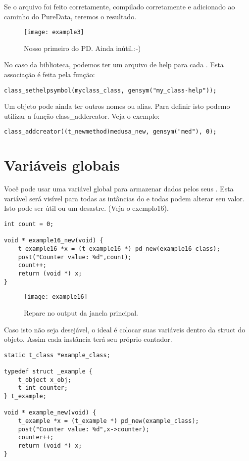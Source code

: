 Se o arquivo foi feito corretamente, compilado corretamente e adicionado ao
caminho do PureData, teremos o resultado.

\begin{figure}[h!]
	\centering
	\texttt{[image: example3]}
	\caption{Nosso primeiro \external do PD. Ainda inútil.:-)}
\end{figure}


No caso da biblioteca, podemos ter um arquivo de help para cada \external. Esta
associação é feita pela função:

\vspace{1em}
\begin{lstlisting}
class_sethelpsymbol(myclass_class, gensym("my_class-help"));
\end{lstlisting}

Um objeto pode ainda ter outros nomes ou alias. Para definir isto podemo utilizar a função class\_addcreator. Veja o exemplo:

\vspace{1em}
\begin{lstlisting}
class_addcreator((t_newmethod)medusa_new, gensym("med"), 0);
\end{lstlisting}

\section{Variáveis globais}

Você pode usar uma variável global para armazenar dados pelos seus \externals.
Esta variável será visível para todas as intâncias do \external e todas podem
alterar seu valor. Isto pode ser útil ou um desastre. (Veja o exemplo16).

\vspace{1em}
\begin{lstlisting}
int count = 0;

void * example16_new(void) {
    t_example16 *x = (t_example16 *) pd_new(example16_class);
    post("Counter value: %d",count);
    count++;
    return (void *) x;
}
\end{lstlisting}

\begin{figure}[h!]
	\centering
	\texttt{[image: example16]}
	\caption{Repare no output da janela principal.}
\end{figure}

Caso isto não seja desejável, o ideal é colocar suas variáveis dentro da
struct do objeto. Assim cada instância terá seu próprio contador.

\vspace{1em}
\begin{lstlisting}
static t_class *example_class;

typedef struct _example {
    t_object x_obj;
    t_int counter;
} t_example;

void * example_new(void) {
    t_example *x = (t_example *) pd_new(example_class);
    post("Counter value: %d",x->counter);
    counter++;
    return (void *) x;
}

\end{lstlisting}

